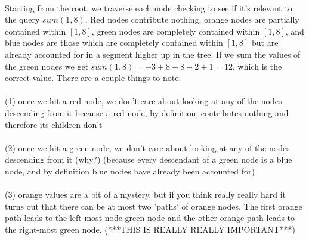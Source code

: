 \documentclass[11pt]{article}
\theoremstyle{plain}
\theoremstyle{definition}
\begin{document}
\begin{figure}[h]
{
}
\end{figure}
\\ \noindent Starting from the root, we traverse each node checking to see if it's relevant to the query $sum(1, 8)$. Red nodes contribute nothing, orange nodes are partially contained within $[1, 8]$, green nodes are completely contained within $[1, 8]$, and blue nodes are those which are completely contained within $[1, 8]$ but are already accounted for in a segment higher up in the tree. If we sum the values of the green nodes we get $sum(1, 8) = -3 + 8 + 8 - 2 + 1 = 12$, which is the correct value. There are a couple things to note: \\\\
(1) once we hit a red node, we don't care about looking at any of the nodes descending from it because a red node, by definition, contributes nothing and therefore its children don't
\\\\
(2) once we hit a green node, we don't care about looking at any of the nodes descending from it (why?) (because every descendant of a green node is a blue node, and by definition blue nodes have already been accounted for)
\\\\
(3) orange values are a bit of a mystery, but if you think really really hard it turns out that there can be at most two 'paths' of orange nodes. The first orange path leads to the left-most node green node and the other orange path leads to the right-most green node. (***THIS IS REALLY REALLY IMPORTANT***)
\end{document}
